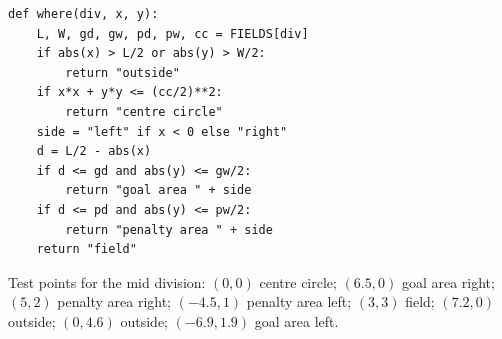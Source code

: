 \begin{enumerate}[label=\textbf{\ansnum.\arabic*}]
\begin{verbatim}
def where(div, x, y):
    L, W, gd, gw, pd, pw, cc = FIELDS[div]
    if abs(x) > L/2 or abs(y) > W/2:
        return "outside"
    if x*x + y*y <= (cc/2)**2:
        return "centre circle"
    side = "left" if x < 0 else "right"
    d = L/2 - abs(x)
    if d <= gd and abs(y) <= gw/2:
        return "goal area " + side
    if d <= pd and abs(y) <= pw/2:
        return "penalty area " + side
    return "field"
\end{verbatim}
  Test points for the mid division: $(0,0)$ centre circle; $(6.5,0)$ goal area right; $(5,2)$ penalty area right; $(-4.5,1)$ penalty area left; $(3,3)$ field; $(7.2,0)$ outside; $(0,4.6)$ outside; $(-6.9,1.9)$ goal area left.
\end{enumerate}
